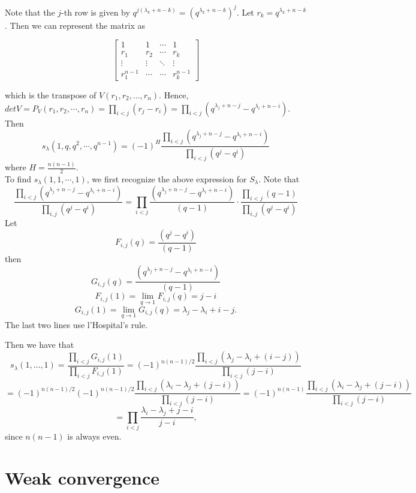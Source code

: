\documentclass[12pt]{article}
\begin{document}
Note that the $j$-th row is given by $q^{j(\lambda_k + n - k)}  = (q^{\lambda_k + n - k})^j$. Let $r_k = q^{\lambda_k + n - k}$. Then we can represent the matrix as

$$\begin{bmatrix} 1 & 1 & \cdots & 1 \\
r_1 & r_2 & \cdots & r_k \\
\vdots & \vdots & \ddots & \vdots \\
r_1^{n-1} & \cdots & \cdots & r_k^{n-1} 
\end{bmatrix} $$

which is the transpose of $V(r_1, r_2, \dots, r_n)$. Hence, $det V = P_V (r_1, r_2, \cdots, r_n) = \prod_{i < j} (r_j - r_i) = \prod _{i < j} ( q^{\lambda_j + n - j} - q^{\lambda_i + n - i} )$. Then 
$$s_\lambda(1, q, q^2, \cdots, q^{n-1}) = (-1)^H \frac{\prod_{i < j} (q^{\lambda_j + n - j} - q^{\lambda_i + n - i} )}{\prod_{i<j} (q^j - q^ i)}$$
where $H = \frac{n(n-1)}{2}$.\\

To find $s_\lambda(1, 1, \cdots, 1)$, we first recognize the above expression for $S_\lambda$. Note that
$$\frac{\prod_{i < j} (q^{\lambda_j + n - j} - q^{\lambda_i + n - i} )}{
	\prod_{i, j} (q^j - q^ i)} =  \prod_{i < j} \frac{(q^{\lambda_j + n - j} - q^{\lambda_i + n - i} )}{(q - 1)}\cdot\frac{\prod_{i<j}(q - 1)}{\prod_{i, j} (q^j - q^i)}$$
Let
$$F_{i, j}(q)  = \frac{(q^j - q^i)}{(q - 1)}$$
then 
$$G_{i, j}(q) = \frac{(q^{\lambda_j + n - j} - q^{\lambda_i + n - i})}{ (q - 1)}$$ 
$$F_{i, j}(1) = \lim_{q\to 1} F_{i,j}(q) = j - i $$
$$G_{i, j}(1)  = \lim_{q\to 1} G_{i,j}(q) = \lambda_j - \lambda_i + i - j.$$
The last two lines use l'Hospital's rule.

Then we have that
$$s_\lambda(1,\dots,1) = \frac{\prod_{i< j} G_{i, j}(1)}{\prod_{i< j} F_{i, j}(1)}
= (-1)^{n(n-1)/2} \frac{\prod_{i< j}  (\lambda_j - \lambda_i + (i - j))}{\prod _{i < j} ( j- i)}$$
$$= (-1)^{n(n-1)/2} (-1)^{n(n-1)/2} \frac{\prod_{i< j}  (\lambda_i - \lambda_j + (j -i))}{\prod _{i < j} (j- i)} = (-1)^{n(n-1)} \frac{\prod_{i< j}  (\lambda_i - \lambda_j + (j-i))}{\prod _{i < j } ( j- i)}$$
$$= \prod_{i< j}  \frac{\lambda_i - \lambda_j + j -i}{j-i},$$
since $n(n-1)$ is always even.



\section{Weak convergence}
\end{document}
